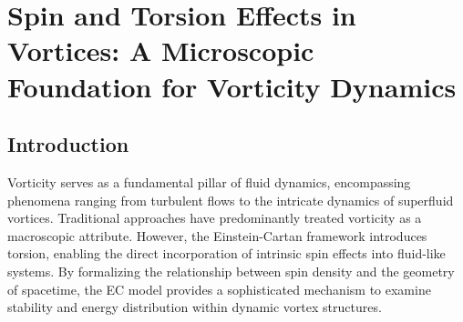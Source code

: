 \documentclass[a4paper,10pt]{article}
\begin{document}
    
\section{Spin and Torsion Effects in Vortices: A Microscopic Foundation for Vorticity Dynamics}


\begin{abstract}
The integration of spin density and torsion within the Einstein-Cartan (EC) framework provides an advanced microscopic foundation for modeling vorticity dynamics. By addressing the intrinsic angular momentum encapsulated by spin density, this study illuminates the mechanisms by which these factors stabilize and influence vortex structures. Leveraging the classical electron model and constants derived from the Æther dynamics paradigm, we present critical equations interlinking spin, torsion, and vortex dynamics. This investigation offers profound implications for understanding quantum fluid behaviors, astrophysical phenomena, and elementary particle interactions, creating a bridge between microscopic dynamics and macroscopic observables.


Furthermore, we extend this framework by analyzing the influence of torsion on the evolution of vorticity fields under different physical conditions, including relativistic and high-energy regimes. This research highlights the robustness of spin-torsion coupling across multiple domains, demonstrating its utility in understanding astrophysical jets, neutron star interiors, and electron vortices in condensed matter systems.
\end{abstract}


\subsection*{Introduction}


Vorticity serves as a fundamental pillar of fluid dynamics, encompassing phenomena ranging from turbulent flows to the intricate dynamics of superfluid vortices. Traditional approaches have predominantly treated vorticity as a macroscopic attribute. However, the Einstein-Cartan framework introduces torsion, enabling the direct incorporation of intrinsic spin effects into fluid-like systems. By formalizing the relationship between spin density and the geometry of spacetime, the EC model provides a sophisticated mechanism to examine stability and energy distribution within dynamic vortex structures.
\end{document}
